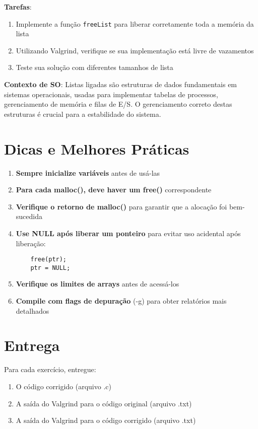 \documentclass[11pt,a4paper]{article}
\begin{document}
\textbf{Tarefas}:
\begin{enumerate}
    \item Implemente a função \texttt{freeList} para liberar corretamente toda a memória da lista
    \item Utilizando Valgrind, verifique se sua implementação está livre de vazamentos
    \item Teste sua solução com diferentes tamanhos de lista
\end{enumerate}

\textbf{Contexto de SO}: Listas ligadas são estruturas de dados fundamentais em sistemas operacionais, usadas para implementar tabelas de processos, gerenciamento de memória e filas de E/S. O gerenciamento correto destas estruturas é crucial para a estabilidade do sistema.

\section{Dicas e Melhores Práticas}

\begin{enumerate}
    \item \textbf{Sempre inicialize variáveis} antes de usá-las
    \item \textbf{Para cada malloc(), deve haver um free()} correspondente
    \item \textbf{Verifique o retorno de malloc()} para garantir que a alocação foi bem-sucedida
    \item \textbf{Use NULL após liberar um ponteiro} para evitar uso acidental após liberação:
    \begin{lstlisting}
    free(ptr);
    ptr = NULL;
    \end{lstlisting}
    \item \textbf{Verifique os limites de arrays} antes de acessá-los
    \item \textbf{Compile com flags de depuração} (-g) para obter relatórios mais detalhados
\end{enumerate}

\section{Entrega}

Para cada exercício, entregue:
\begin{enumerate}
    \item O código corrigido (arquivo .c)
    \item A saída do Valgrind para o código original (arquivo .txt)
    \item A saída do Valgrind para o código corrigido (arquivo .txt)
\end{enumerate}
\end{document}

